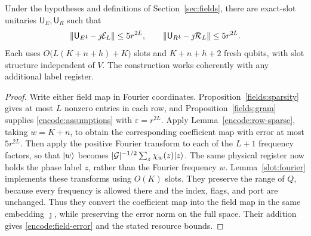 \begin{proposition}\label{encode:implementation}
Under the hypotheses and definitions of Section~\ref{sec:fields}, there
are exact-slot unitaries $\mathsf U_E,\mathsf U_R$ such that
\begin{equation}\label{encode:field-error}
 \lVert \mathsf U_E\iota-\jmath\mathcal E_L\rVert\le5r^{2L},
 \qquad
 \lVert \mathsf U_R\iota-\jmath\mathcal R_L\rVert\le5r^{2L}.
\end{equation}
Each uses $O\bigl(L(K+n+h)+K\bigr)$ slots and $K+n+h+2$ fresh qubits,
with slot structure independent of $V$. The construction works coherently
with any additional label register.
\end{proposition}

\begin{proof}
Write either field map in Fourier coordinates. Proposition~\ref{fields:sparsity}
gives at most $L$ nonzero entries in each row, and
Proposition~\ref{fields:gram} supplies \eqref{encode:assumptions} with
$\varepsilon=r^{2L}$. Apply Lemma~\ref{encode:row-sparse}, taking
$w=K+n$, to obtain the corresponding coefficient map with error at most
$5r^{2L}$. Then apply the positive Fourier transform to each of the
$L+1$ frequency factors, so that $\lvert w\rangle$ becomes
$|\mathcal G|^{-1/2}\sum_z\chi_w(z)\lvert z\rangle$.
The same physical register now holds the phase label $z$, rather than the
Fourier frequency $w$. Lemma~\ref{slot:fourier} implements these transforms
using $O(K)$ slots.
They preserve the range of $Q$, because every frequency is allowed there
and the index, flags, and port are unchanged. Thus they convert the
coefficient map into the field map in the same embedding $\jmath$,
while preserving the error norm on the full space. Their addition
gives \eqref{encode:field-error} and the stated resource bounds.
\end{proof}
